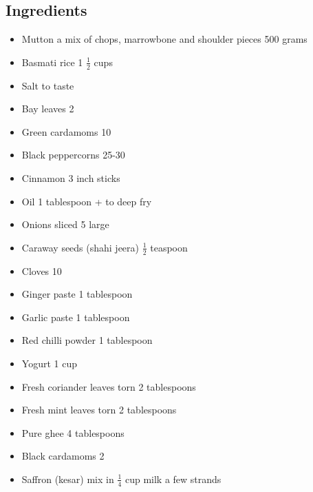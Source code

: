 \documentclass{article}
\begin{document}
        \subsection{Ingredients}
            \begin{itemize}
                \item Mutton a mix of chops, marrowbone and shoulder pieces 500 grams
                \item Basmati rice 1 $\frac{1}{2}$ cups
                \item Salt to taste
                \item Bay leaves 2
                \item Green cardamoms 10
                \item Black peppercorns 25-30
                \item Cinnamon 3 inch sticks
                \item Oil 1 tablespoon + to deep fry
                \item Onions sliced 5 large
                \item Caraway seeds (shahi jeera) $\frac{1}{2}$ teaspoon
                \item Cloves 10
                \item Ginger paste 1 tablespoon
                \item Garlic paste 1 tablespoon
                \item Red chilli powder 1 tablespoon
                \item Yogurt 1 cup
                \item Fresh coriander leaves torn 2 tablespoons
                \item Fresh mint leaves torn 2 tablespoons
                \item Pure ghee 4 tablespoons
                \item Black cardamoms 2
                \item Saffron (kesar) mix in $\frac{1}{4}$ cup milk a few strands 
            \end{itemize}
              
\end{document}

